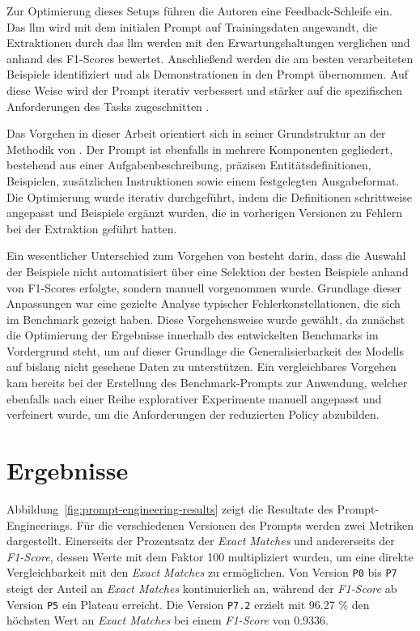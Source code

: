 Zur Optimierung dieses Setups führen die Autoren eine Feedback-Schleife ein.
Das \gls{llm} wird mit dem initialen Prompt auf Trainingsdaten angewandt, die Extraktionen durch das \gls{llm} werden mit den Erwartungshaltungen verglichen und anhand des F1-Scores bewertet.
Anschließend werden die am besten verarbeiteten Beispiele identifiziert und als Demonstrationen in den Prompt übernommen.
Auf diese Weise wird der Prompt iterativ verbessert und stärker auf die spezifischen Anforderungen des Tasks zugeschnitten \autocite{cheng_novel_2024}.

Das Vorgehen in dieser Arbeit orientiert sich in seiner Grundstruktur an der Methodik von \citeauthor{cheng_novel_2024} \autocite{cheng_novel_2024}.
Der Prompt ist ebenfalls in mehrere Komponenten gegliedert, bestehend aus einer Aufgabenbeschreibung, präzisen Entitätsdefinitionen, Beispielen, zusätzlichen Instruktionen sowie einem festgelegten Ausgabeformat.
Die Optimierung wurde iterativ durchgeführt, indem die Definitionen schrittweise angepasst und Beispiele ergänzt wurden, die in vorherigen Versionen zu Fehlern bei der Extraktion geführt hatten.

Ein wesentlicher Unterschied zum Vorgehen von \citeauthor{cheng_novel_2024} \autocite{cheng_novel_2024} besteht darin, dass die Auswahl der Beispiele nicht automatisiert über eine Selektion der besten Beispiele anhand von F1-Scores erfolgte, sondern manuell vorgenommen wurde.
Grundlage dieser Anpassungen war eine gezielte Analyse typischer Fehlerkonstellationen, die sich im Benchmark gezeigt haben.
Diese Vorgehensweise wurde gewählt, da zunächst die Optimierung der Ergebnisse innerhalb des entwickelten Benchmarks im Vordergrund steht, um auf dieser Grundlage die Generalisierbarkeit des Modells auf bislang nicht gesehene Daten zu unterstützen.
Ein vergleichbares Vorgehen kam bereits bei der Erstellung des Benchmark-Prompts zur Anwendung, welcher ebenfalls nach einer Reihe explorativer Experimente manuell angepasst und verfeinert wurde, um die Anforderungen der reduzierten Policy abzubilden.


\section{Ergebnisse}

Abbildung~\ref{fig:prompt-engineering-results} zeigt die Resultate des Prompt-Engineerings.
Für die verschiedenen Versionen des Prompts werden zwei Metriken dargestellt.
Einerseits der Prozentsatz der \textit{Exact Matches} und andererseits der \textit{F1-Score}, dessen Werte mit dem Faktor \num{100} multipliziert wurden, um eine direkte Vergleichbarkeit mit den \textit{Exact Matches} zu ermöglichen.
Von Version \texttt{P0} bis \texttt{P7} steigt der Anteil an \textit{Exact Matches} kontinuierlich an, während der \textit{F1-Score} ab Version \texttt{P5} ein Plateau erreicht.
Die Version \texttt{P7.2} erzielt mit \num{96.27} \% den höchsten Wert an \textit{Exact Matches} bei einem \textit{F1-Score} von \num{0.9336}.

